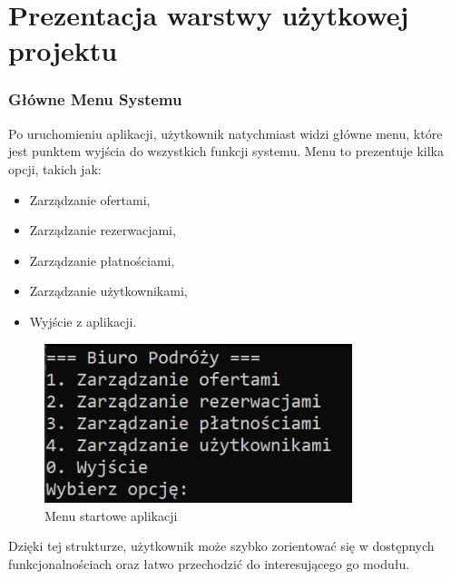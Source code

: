 ﻿%
\chapter{Prezentacja warstwy użytkowej projektu}
\subsection{Główne Menu Systemu}
Po uruchomieniu aplikacji, użytkownik natychmiast widzi główne menu, które jest punktem wyjścia do wszystkich funkcji systemu. Menu to prezentuje kilka opcji, takich jak:
\begin{itemize}
    \item Zarządzanie ofertami,
    \item Zarządzanie rezerwacjami,
    \item Zarządzanie płatnościami,
    \item Zarządzanie użytkownikami,
    \item Wyjście z aplikacji.
\end{itemize}

\begin{figure}[htbp]
  \centering
  \includegraphics[width=0.8\textwidth]{figures/menu.jpg} 
  \caption{Menu startowe aplikacji}
  \label{fig:obrazek}
\end{figure}

Dzięki tej strukturze, użytkownik może szybko zorientować się w dostępnych funkcjonalnościach oraz łatwo przechodzić do interesującego go modułu.
\newpage
